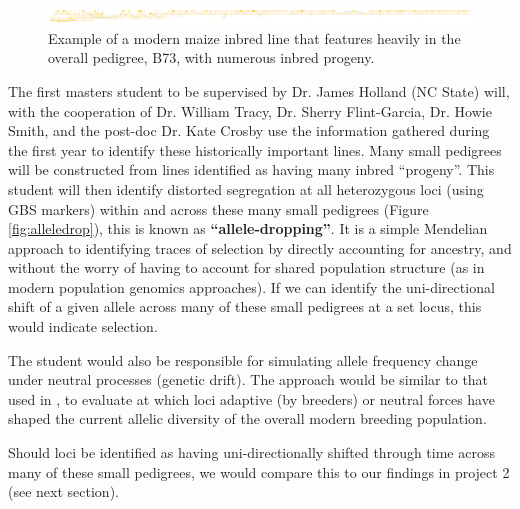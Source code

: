 \documentclass[12pt]{article}
\begin{document}
\begin{figure}[ht]
\includegraphics[width=1.0\linewidth]{pedigree_poster.pdf}
\caption{Example of a modern maize inbred line that features heavily in the overall pedigree, B73, with numerous inbred progeny.}
\label{fig:b73isbig}
\end{figure}

\par The first masters student to be supervised by Dr. James Holland (NC State) will, with the cooperation of Dr. William Tracy, Dr. Sherry Flint-Garcia, Dr. Howie Smith, and the post-doc Dr. Kate Crosby use the information gathered during the first year to identify these historically important lines. Many small pedigrees will be constructed from lines identified as having many inbred ``progeny''. This student will then identify distorted segregation at all heterozygous loci (using GBS markers) within and across these many small pedigrees (Figure \ref{fig:alleledrop}), this is known as \textbf{``allele-dropping''}. It is a simple Mendelian approach to identifying traces of selection by directly accounting for ancestry, and without the worry of having to account for shared population structure (as in modern population genomics approaches). If we can identify the uni-directional shift of a given allele across many of these small pedigrees at a set locus, this would indicate selection. 
\par The student would also be responsible for simulating allele frequency change under neutral processes (genetic drift). The approach would be similar to that used in \citep{Gerke:2013tw}, to evaluate at which loci adaptive (by breeders) or neutral forces have shaped the current allelic diversity of the overall modern breeding population. 
\par Should loci be identified as having uni-directionally shifted through time across many of these small pedigrees, we would compare this to our findings in project 2 (see next section).
\end{document}

